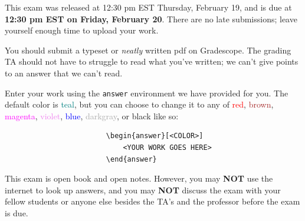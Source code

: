 \documentclass[11pt]{article}
\begin{document}

This exam was released at 12:30 pm EST Thursday, February 19, and is due at \textbf{12:30 pm EST on Friday, February 20}. There are no late submissions; leave yourself enough time to upload your work.

You should submit a typeset or \emph{neatly} written pdf on Gradescope.  The grading TA should not have to struggle to read what you've written; we can't give points to an answer that we can't read.

Enter your work using the \verb|answer| environment we have provided for you. The default color is \textcolor{teal}{teal}, but you can choose to change it to any of \textcolor{red}{red}, \textcolor{brown}{brown}, \textcolor{magenta}{magenta}, \textcolor{violet}{violet}, \textcolor{blue}{blue}, \textcolor{darkgray}{darkgray}, or black like so:
\begin{verbatim}
                        \begin{answer}[<COLOR>]
                            <YOUR WORK GOES HERE> 
                        \end{answer}
\end{verbatim}

This exam is open book and open notes. However, you may \textbf{NOT} use the internet to look up answers, and you may \textbf{NOT} discuss the exam with your fellow students or anyone else besides the TA's and the professor before the exam is due.
\end{document}

